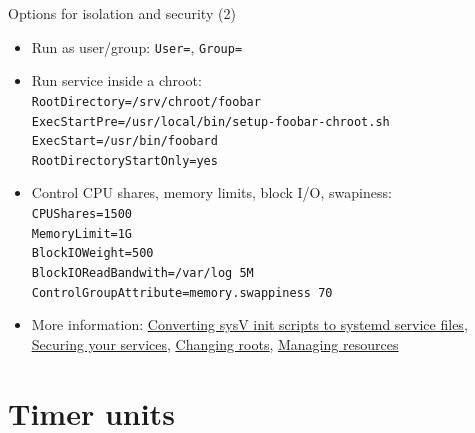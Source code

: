 \documentclass[11pt,final,usepdftitle=false]{beamer}
\begin{document}
\begin{frame}{Options for isolation and security (2)}
\begin{itemize}
		\item Run as user/group: \texttt{User=}, \texttt{Group=}
			\hbr
		\item Run service inside a chroot:\\
			\texttt{RootDirectory=/srv/chroot/foobar}\\
			\texttt{ExecStartPre=/usr/local/bin/setup-foobar-chroot.sh}\\
			\texttt{ExecStart=/usr/bin/foobard}\\
			\texttt{RootDirectoryStartOnly=yes}
			\hbr
		\item Control CPU shares, memory limits, block I/O, swapiness:\\
			\texttt{CPUShares=1500}\\
			\texttt{MemoryLimit=1G}\\
			\texttt{BlockIOWeight=500}\\
			\texttt{BlockIOReadBandwith=/var/log 5M}\\
			\texttt{ControlGroupAttribute=memory.swappiness 70}
			\hbr
		\item More information:
				\href{http://0pointer.net/blog/projects/systemd-for-admins-3.html}{\ul{Converting sysV init scripts to systemd service files}},
				\href{http://0pointer.net/blog/projects/security.html}{\ul{Securing your services}},
				\href{http://0pointer.net/blog/projects/changing-roots.html}{\ul{Changing roots}},
				\href{http://0pointer.net/blog/projects/resources.html}{\ul{Managing resources}}
	\end{itemize}
\end{frame}

\section{Timer units}
\end{document}
